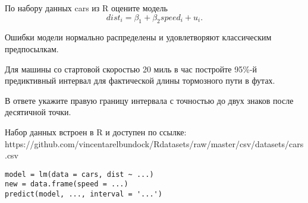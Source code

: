 
\begin{question}
По набору данных cars из R оцените модель
\[
dist_i = \beta_1 + \beta_2 speed_i + u_i.
\]

Ошибки модели нормально распределены и удовлетворяют классическим предпосылкам.

Для машины со стартовой скоростью 20 миль в час постройте 95\%-й предиктивный интервал для
фактической длины тормозного пути в футах.

В ответе укажите правую границу интервала с точностью до двух знаков после десятичной точки.

Набор данных встроен в R и доступен по ссылке:
https://github.com/vincentarelbundock/Rdatasets/raw/master/csv/datasets/cars.csv
\end{question}

\begin{solution}
\begin{verbatim}
model = lm(data = cars, dist ~ ...)
new = data.frame(speed = ...)
predict(model, ..., interval = '...')
\end{verbatim}
\end{solution}

